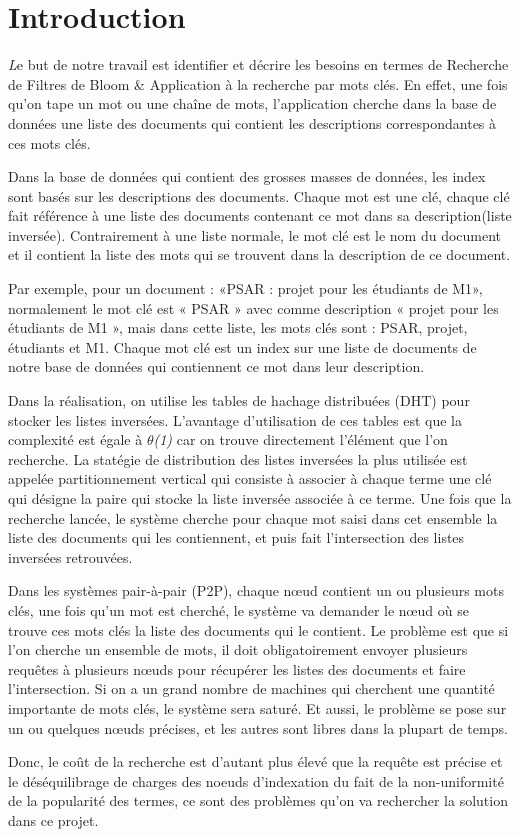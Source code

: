 
\chapter{Introduction}
	{\huge \itshape L}e but de notre travail est identifier et décrire les besoins en termes de Recherche de Filtres de Bloom \& Application à la recherche par mots clés. En effet, une fois qu'on tape un mot ou une chaîne de mots, l’application cherche dans la base de données une liste des documents qui contient les descriptions correspondantes à ces mots clés.
	
	Dans la base de données qui contient des grosses masses de données, les index sont basés sur les descriptions des documents. Chaque mot est une clé, chaque clé fait référence à une liste des documents contenant ce mot dans sa description(liste inversée). Contrairement à une liste normale, le mot clé est le nom du document et il contient la liste des mots qui se trouvent dans la description de ce document.
	
	Par exemple, pour un document : «PSAR : projet pour les étudiants de M1», normalement le mot clé est « PSAR » avec comme description « projet pour les étudiants de M1 », mais dans cette liste, les mots clés sont : PSAR, projet, étudiants et M1. Chaque mot clé est un index sur une liste de documents de notre base de données qui contiennent ce mot dans leur description.
	
	Dans la réalisation, on utilise les tables de hachage distribuées (DHT) pour stocker les listes inversées. L'avantage d'utilisation de ces tables est que la complexité est égale à $ \theta ${\em (1)} car on trouve directement l'élément que l'on recherche. La statégie de distribution des listes inversées la plus utilisée est appelée partitionnement vertical qui consiste à associer à chaque terme une clé qui désigne la paire qui stocke la liste inversée associée à ce terme. Une fois que la recherche lancée, le système cherche pour chaque mot saisi dans cet ensemble la liste des documents qui les contiennent, et puis fait l'intersection des listes inversées retrouvées. 

	Dans les systèmes pair-à-pair (P2P), chaque n{\oe}ud contient un ou plusieurs mots clés, une fois qu'un mot est cherché, le système va demander le n{\oe}ud où se trouve ces mots clés la liste des documents qui le contient. Le problème est que si l'on cherche un ensemble de mots, il doit obligatoirement envoyer plusieurs requêtes à plusieurs n{\oe}uds pour récupérer les listes des documents et faire l'intersection. Si on a un grand nombre de machines qui cherchent une quantité importante de mots clés, le système sera saturé. Et aussi, le problème se pose sur un ou quelques n{\oe}uds précises, et les autres sont libres dans la plupart de temps. 
	
	Donc, le coût de la recherche est d'autant plus élevé que la requête est précise et le déséquilibrage de charges des noeuds d'indexation du fait de la non-uniformité de la popularité des termes, ce sont des problèmes qu'on va rechercher la solution dans ce projet.
	
	